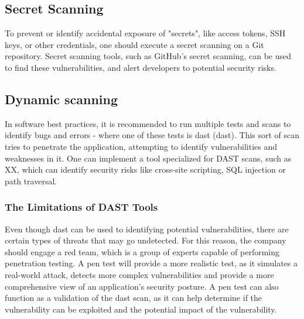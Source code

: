 \subsection{Secret Scanning}
To prevent or identify accidental exposure of "secrets", like access tokens, SSH keys, or other credentials, one should execute a secret scanning on a Git repository. Secret scanning tools, such as GitHub's secret scanning, can be used to find these vulnerabilities, and alert developers to potential security risks. \cite{GithubSecretScanning}


\subsection{Dynamic scanning}
In software best practices, it is recommended to run multiple tests and scans to identify bugs and errors - where one of these tests is \acrlong{dast} (\acrshort{dast}).\cite{bestpracticeSupplyChain} This sort of scan tries to penetrate the application, attempting to identify vulnerabilities and weaknesses in it. One can implement a tool specialized for DAST scans, such as XX, which can identify security risks like cross-site scripting, SQL injection or path traversal.\cite{dynamictesting}


\subsubsection{The Limitations of DAST Tools}
Even though \acrshort{dast} can be used to identifying potential vulnerabilities, there are certain types of threats that may go undetected. For this reason, the company should engage a red team, which is a group of experts capable of performing penetration testing. A pen test will provide a more realistic test, as it simulates a real-world attack, detects more complex vulnerabilities and provide a more comprehensive view of an application's security posture. A pen test can also function as a validation of the \acrshort{dast} scan, as it can help determine if the vulnerability can be exploited and the potential impact of the vulnerability. \cite{dastpentesting}



